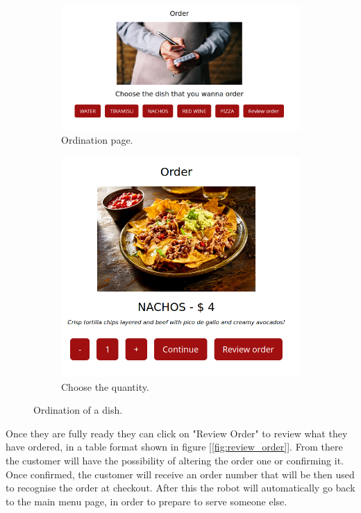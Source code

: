 \documentclass[12pt, letterpaper, twoside]{article}
\begin{document}
\begin{figure}[h]
	\centering
	\begin{subfigure}{.5\textwidth}
	  \centering
	  \includegraphics[width=1\linewidth]{img/order.png}
	  \caption{Ordination page.}
	  \label{fig:order}
	\end{subfigure}%
	\begin{subfigure}{.5\textwidth}
	  \centering
	  \includegraphics[width=.6\linewidth]{img/order_quantity.png}
	  \caption{Choose the quantity.}
	  \label{fig:order_quantity}
	\end{subfigure}
	\caption{Ordination of a dish.}
	\label{fig:ordination}
\end{figure}

Once they are fully ready they can click on "Review Order" to review what they have ordered, in a table format shown in figure [\ref{fig:review_order}]. From there the customer will have the possibility of altering the order one or confirming it. Once confirmed, the customer will receive an order number that will be then used to recognise the order at checkout. After this the robot will automatically go back to the main menu page, in order to prepare to serve someone else.
\end{document}

